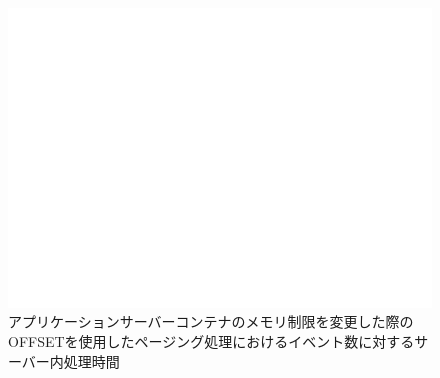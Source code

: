 \documentclass[../../../../../main]{subfiles}
\begin{document}
    \begin{figure}[H]
        \centering
        \includegraphics[width=12cm]{graph}
        \caption{アプリケーションサーバーコンテナのメモリ制限を変更した際のOFFSETを使用したページング処理におけるイベント数に対するサーバー内処理時間}
        \label{fig:paging-offset-change-app-memory-limit-server-time-app_4_db_1_1024}
    \end{figure}
\end{document}
